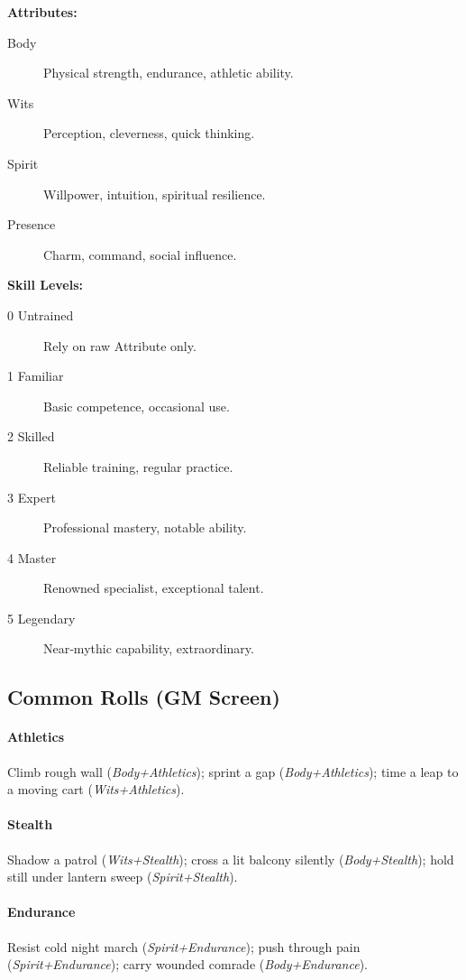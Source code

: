 \textbf{Attributes:}
\begin{description}
    \item[Body] Physical strength, endurance, athletic ability.
    \item[Wits] Perception, cleverness, quick thinking.
    \item[Spirit] Willpower, intuition, spiritual resilience.
    \item[Presence] Charm, command, social influence.
\end{description}

\textbf{Skill Levels:}
\begin{description}
    \item[0 Untrained] Rely on raw Attribute only.
    \item[1 Familiar] Basic competence, occasional use.
    \item[2 Skilled] Reliable training, regular practice.
    \item[3 Expert] Professional mastery, notable ability.
    \item[4 Master] Renowned specialist, exceptional talent.
    \item[5 Legendary] Near‑mythic capability, extraordinary.
\end{description}

\subsection{Common Rolls (GM Screen)}\label{subsec:common_rolls}

\paragraph{Athletics}
Climb rough wall (\emph{Body+Athletics}); sprint a gap (\emph{Body+Athletics}); time a leap to a moving cart (\emph{Wits+Athletics}).

\paragraph{Stealth}
Shadow a patrol (\emph{Wits+Stealth}); cross a lit balcony silently (\emph{Body+Stealth}); hold still under lantern sweep (\emph{Spirit+Stealth}).

\paragraph{Endurance}
Resist cold night march (\emph{Spirit+Endurance}); push through pain (\emph{Spirit+Endurance}); carry wounded comrade (\emph{Body+Endurance}).

